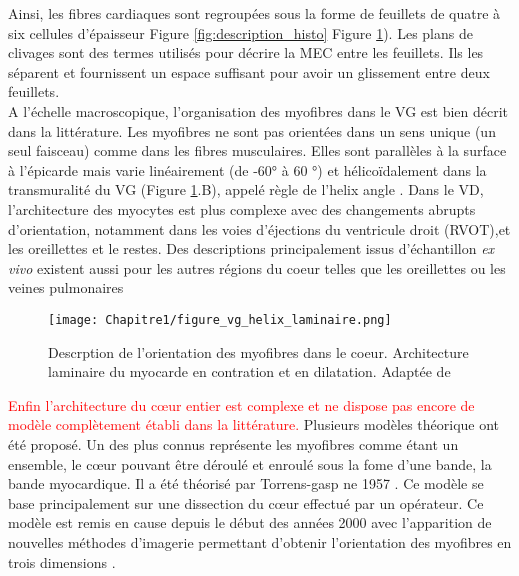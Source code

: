 Ainsi, les fibres cardiaques sont regroupées sous la forme de feuillets de quatre à six cellules d’épaisseur 
Figure \ref{fig:description_histo} Figure \ref{fig:model_fibre}). Les plans de clivages sont des termes utilisés pour 
décrire la MEC entre les feuillets. Ils les séparent et fournissent un espace suffisant pour avoir un glissement
 entre deux feuillets.
\\
A l'échelle macroscopique, l’organisation des myofibres dans le VG est bien décrit dans la littérature.
 Les myofibres ne sont pas orientées dans un sens unique (un seul faisceau) comme dans les fibres musculaires.
  Elles sont parallèles à la surface à l’épicarde mais varie linéairement (de -60° à 60 °) et hélicoïdalement dans la
   transmuralité du VG (Figure \ref{fig:model_fibre}.B), appelé règle de l’helix
    angle \cite{NiellesVallespin2019} \cite{STREETER1969}. Dans le VD, 
    l’architecture des myocytes est plus complexe \cite{Vetter2005} avec des changements abrupts d’orientation,
     notamment dans les voies d’éjections du ventricule droit (RVOT),et les oreillettes et le restes. Des descriptions principalement issus d'échantillon \textit{ex vivo} existent 
     aussi pour les autres régions du coeur telles que les oreillettes \cite{Pashakhanloo2016} 
     ou les veines pulmonaires \cite{Doste2019} \\
     

\begin{figure}[!h]
  \begin{center}
    \texttt{[image: Chapitre1/figure\_vg\_helix\_laminaire.png]}
  \end{center}
  \caption{Descrption de l'orientation des myofibres dans le coeur.  Architecture laminaire du myocarde en contration
   et en dilatation. Adaptée de \cite{NiellesVallespin2019}}
  \label{fig:model_fibre}
\end{figure}



\textcolor{red}{Enfin l’architecture du cœur entier est complexe et ne dispose pas encore de modèle complètement établi dans la littérature.} Plusieurs modèles théorique ont été proposé. Un des plus connus représente les myofibres comme étant un ensemble, le cœur pouvant être déroulé et enroulé sous la fome d’une bande, la bande myocardique. Il a été théorisé par Torrens-gasp ne 1957 \cite{Kocica2006}. Ce modèle se base principalement sur une dissection du cœur effectué par un opérateur. Ce modèle est remis en cause depuis le début des années 2000 avec l’apparition de nouvelles méthodes d’imagerie permettant d’obtenir l’orientation des myofibres en trois dimensions \cite{MacIver2017_end_I} \cite{MacIver2017_end_II}. \\  %

